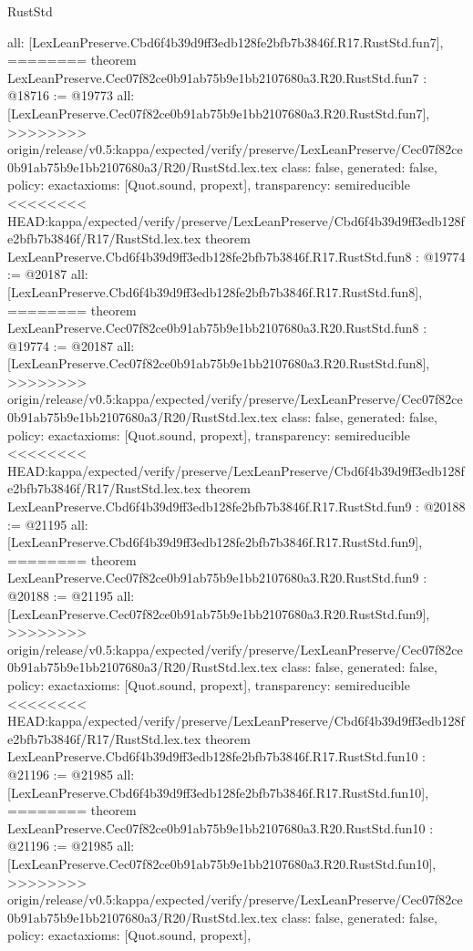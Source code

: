 \begin{lexlean}{RustStd}
\begin{coremodule}
{\begin{coremodule}
{{{{{{{{{{  all: [LexLeanPreserve.Cbd6f4b39d9ff3edb128fe2bfb7b3846f.R17.RustStd.fun7],
========
theorem LexLeanPreserve.Cec07f82ce0b91ab75b9e1bb2107680a3.R20.RustStd.fun7 : @18716 := @19773 {
  all: [LexLeanPreserve.Cec07f82ce0b91ab75b9e1bb2107680a3.R20.RustStd.fun7],
>>>>>>>> origin/release/v0.5:kappa/expected/verify/preserve/LexLeanPreserve/Cec07f82ce0b91ab75b9e1bb2107680a3/R20/RustStd.lex.tex
  class: false,
  generated: false,
  policy: exact{axioms: [Quot.sound, propext]},
  transparency: semireducible
}
<<<<<<<< HEAD:kappa/expected/verify/preserve/LexLeanPreserve/Cbd6f4b39d9ff3edb128fe2bfb7b3846f/R17/RustStd.lex.tex
theorem LexLeanPreserve.Cbd6f4b39d9ff3edb128fe2bfb7b3846f.R17.RustStd.fun8 : @19774 := @20187 {
  all: [LexLeanPreserve.Cbd6f4b39d9ff3edb128fe2bfb7b3846f.R17.RustStd.fun8],
========
theorem LexLeanPreserve.Cec07f82ce0b91ab75b9e1bb2107680a3.R20.RustStd.fun8 : @19774 := @20187 {
  all: [LexLeanPreserve.Cec07f82ce0b91ab75b9e1bb2107680a3.R20.RustStd.fun8],
>>>>>>>> origin/release/v0.5:kappa/expected/verify/preserve/LexLeanPreserve/Cec07f82ce0b91ab75b9e1bb2107680a3/R20/RustStd.lex.tex
  class: false,
  generated: false,
  policy: exact{axioms: [Quot.sound, propext]},
  transparency: semireducible
}
<<<<<<<< HEAD:kappa/expected/verify/preserve/LexLeanPreserve/Cbd6f4b39d9ff3edb128fe2bfb7b3846f/R17/RustStd.lex.tex
theorem LexLeanPreserve.Cbd6f4b39d9ff3edb128fe2bfb7b3846f.R17.RustStd.fun9 : @20188 := @21195 {
  all: [LexLeanPreserve.Cbd6f4b39d9ff3edb128fe2bfb7b3846f.R17.RustStd.fun9],
========
theorem LexLeanPreserve.Cec07f82ce0b91ab75b9e1bb2107680a3.R20.RustStd.fun9 : @20188 := @21195 {
  all: [LexLeanPreserve.Cec07f82ce0b91ab75b9e1bb2107680a3.R20.RustStd.fun9],
>>>>>>>> origin/release/v0.5:kappa/expected/verify/preserve/LexLeanPreserve/Cec07f82ce0b91ab75b9e1bb2107680a3/R20/RustStd.lex.tex
  class: false,
  generated: false,
  policy: exact{axioms: [Quot.sound, propext]},
  transparency: semireducible
}
<<<<<<<< HEAD:kappa/expected/verify/preserve/LexLeanPreserve/Cbd6f4b39d9ff3edb128fe2bfb7b3846f/R17/RustStd.lex.tex
theorem LexLeanPreserve.Cbd6f4b39d9ff3edb128fe2bfb7b3846f.R17.RustStd.fun10 : @21196 := @21985 {
  all: [LexLeanPreserve.Cbd6f4b39d9ff3edb128fe2bfb7b3846f.R17.RustStd.fun10],
========
theorem LexLeanPreserve.Cec07f82ce0b91ab75b9e1bb2107680a3.R20.RustStd.fun10 : @21196 := @21985 {
  all: [LexLeanPreserve.Cec07f82ce0b91ab75b9e1bb2107680a3.R20.RustStd.fun10],
>>>>>>>> origin/release/v0.5:kappa/expected/verify/preserve/LexLeanPreserve/Cec07f82ce0b91ab75b9e1bb2107680a3/R20/RustStd.lex.tex
  class: false,
  generated: false,
  policy: exact{axioms: [Quot.sound, propext]},
}}}}}}}}}}}}}}
\end{coremodule}}
\end{coremodule}
\end{lexlean}
